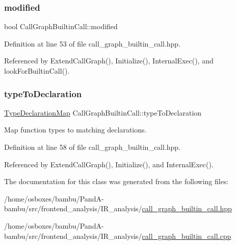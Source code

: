 \subsubsection{\texorpdfstring{modified}{modified}}
{\footnotesize\ttfamily bool Call\+Graph\+Builtin\+Call\+::modified\hspace{0.3cm}{\ttfamily [private]}}



Definition at line 53 of file call\+\_\+graph\+\_\+builtin\+\_\+call.\+hpp.



Referenced by Extend\+Call\+Graph(), Initialize(), Internal\+Exec(), and look\+For\+Builtin\+Call().

\mbox{\label{classCallGraphBuiltinCall_aa7f85e6b78133e24ae7c87ab42bcc497}} 
\subsubsection{\texorpdfstring{type\+To\+Declaration}{typeToDeclaration}}
{\footnotesize\ttfamily \hyperlink{classCallGraphBuiltinCall_ac5000af275152e4c862dc90cfe1453d0}{Type\+Declaration\+Map} Call\+Graph\+Builtin\+Call\+::type\+To\+Declaration\hspace{0.3cm}{\ttfamily [private]}}



Map function types to matching declarations. 



Definition at line 58 of file call\+\_\+graph\+\_\+builtin\+\_\+call.\+hpp.



Referenced by Extend\+Call\+Graph(), Initialize(), and Internal\+Exec().



The documentation for this class was generated from the following files\+:\begin{DoxyCompactItemize}
\item 
/home/osboxes/bambu/\+Pand\+A-\/bambu/src/frontend\+\_\+analysis/\+I\+R\+\_\+analysis/\hyperlink{call__graph__builtin__call_8hpp}{call\+\_\+graph\+\_\+builtin\+\_\+call.\+hpp}\item 
/home/osboxes/bambu/\+Pand\+A-\/bambu/src/frontend\+\_\+analysis/\+I\+R\+\_\+analysis/\hyperlink{call__graph__builtin__call_8cpp}{call\+\_\+graph\+\_\+builtin\+\_\+call.\+cpp}\end{DoxyCompactItemize}
